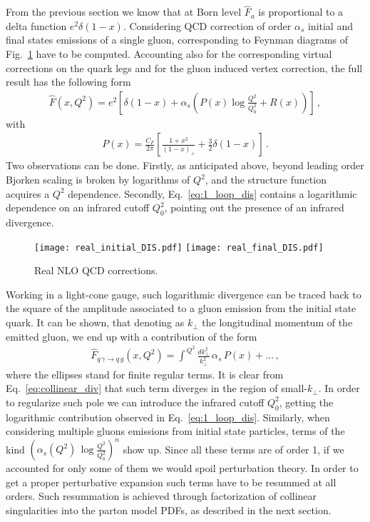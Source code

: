 %
From the previous section we know that at Born level $\hat{F}_a$ is proportional
to a delta function $e^2\delta\left(1-x\right)$. 
Considering QCD correction of order $\alpha_s$
initial and final states emissions of a single gluon, corresponding to Feynman diagrams of Fig.~\ref{fig:NLO_QCD_DIS}
have to be computed. 
Accounting also for the corresponding virtual corrections on the quark legs
and for the gluon induced vertex correction, the full result has the following form
\begin{align}
    \label{eq:1_loop_dis}
    \hat{F}\left(x,Q^2\right) = e^2\left[\delta\left(1-x\right) 
    + \alpha_s\left(P\left(x\right)\log\frac{Q^2}{Q_0^2} + R\left(x\right) \right)  \right]\,,
\end{align}
with
\begin{align}
    \label{eq:splitting_function}
    P\left(x\right) = \frac{C_F}{2\pi}\left[\frac{1+x^2}{\left(1-x\right)_+} + \frac{3}{2}\delta\left(1-x\right)\right]\,.
\end{align}
Two observations can be done. Firstly, as anticipated above, beyond leading order
Bjorken scaling is broken by logarithms of $Q^2$, and the structure function acquires a $Q^2$ dependence.
Secondly, Eq.~\ref{eq:1_loop_dis} contains a logarithmic dependence on an infrared cutoff $Q_0^2$, pointing out 
the presence of an infrared divergence.
\begin{figure}[h]
    \centering
    \texttt{[image: real\_initial\_DIS.pdf]}
    \texttt{[image: real\_final\_DIS.pdf]}
    \caption{Real NLO QCD corrections.}
    \label{fig:NLO_QCD_DIS}
\end{figure}

%
Working in a light-cone gauge, such logarithmic divergence can be traced back to the square of the amplitude associated
to a gluon emission from the initial state quark.
It can be shown, that denoting as $k_{\perp}$ the longitudinal momentum of the emitted gluon,
we end up with a contribution of the form
\begin{align}
    \label{eq:collinear_div}
    \hat{F}_{q\, \gamma \rightarrow q\,g}\left(x,Q^2\right) =
    \int^{\,Q^2}\frac{dk_{\perp}^2}{k_{\perp}^2}\, \alpha_s\, P\left(x\right) + ...\,,
\end{align}
where the ellipses stand for finite regular terms.
It is clear from Eq.~\ref{eq:collinear_div} that such term diverges in the region of small-$k_{\perp}$.
In order to regularize such pole we can introduce the infrared cutoff $Q_0^2$, getting the logarithmic 
contribution observed in Eq.~\ref{eq:1_loop_dis}.
Similarly, when considering multiple gluons emissions from initial state particles, terms of the kind 
$\left(\alpha_s\left(Q^2\right)\,\log\frac{Q^2}{Q_0^2}\right)^n$ show up.
Since all these terms are of order 1, if we accounted for only some of them we would spoil perturbation theory.
In order to get a proper perturbative expansion such terms have to be resummed at all orders.
Such resummation is achieved through factorization of collinear singularities into the parton model PDFs,
as described in the next section.

